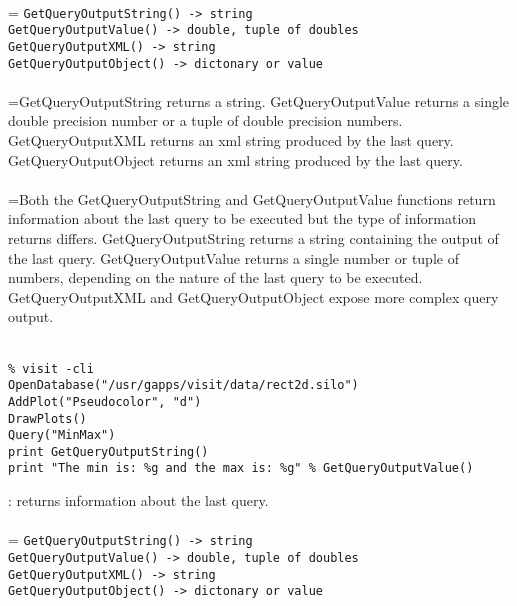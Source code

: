 \documentclass[10pt,a4paper]{report}
\begin{document}
 \\ 
\hangindent=\parindent 
\verb!GetQueryOutputString() -> string!\\ 
\verb!GetQueryOutputValue() -> double, tuple of doubles!\\ 
\verb!GetQueryOutputXML() -> string!\\ 
\verb!GetQueryOutputObject() -> dictonary or value!\\ [-3mm]

 \\ 
\hangindent=\parindent GetQueryOutputString returns a string. GetQueryOutputValue returns a single double precision number or a tuple of double precision numbers. GetQueryOutputXML returns an xml string produced by the last query. GetQueryOutputObject returns an xml string produced by the last query. \\[-3mm] 

 \\ 
\hangindent=\parindent Both the GetQueryOutputString and GetQueryOutputValue functions return information about the last query to be executed but the type of information returns differs. GetQueryOutputString returns a string containing the output of the last query. GetQueryOutputValue returns a single number or tuple of numbers, depending on the nature of the last query to be executed.  GetQueryOutputXML and GetQueryOutputObject expose more complex query output. \\[-3mm] 

\\[-6mm]
\begin{verbatim}% visit -cli
OpenDatabase("/usr/gapps/visit/data/rect2d.silo")
AddPlot("Pseudocolor", "d")
DrawPlots()
Query("MinMax")
print GetQueryOutputString()
print "The min is: %g and the max is: %g" % GetQueryOutputValue()
\end{verbatim}
\newpage


{}
: returns information about the last query.\\[-3mm]

 \\ 
\hangindent=\parindent 
\verb!GetQueryOutputString() -> string!\\ 
\verb!GetQueryOutputValue() -> double, tuple of doubles!\\ 
\verb!GetQueryOutputXML() -> string!\\ 
\verb!GetQueryOutputObject() -> dictonary or value!\\ [-3mm]
\end{document}

